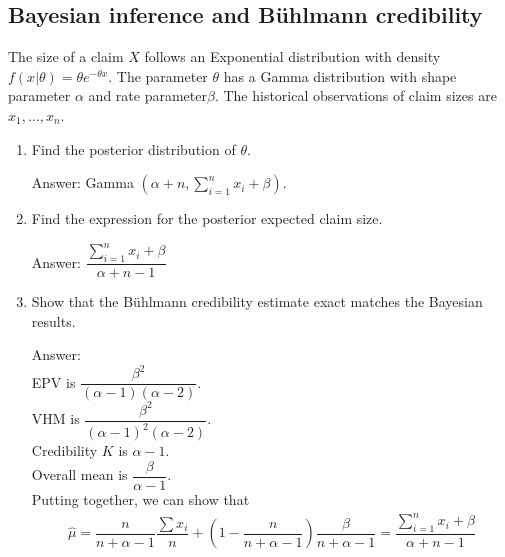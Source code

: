 \documentclass[11pt,a4paper,onecolumn]{article}
\begin{document}
\subsection{Bayesian inference and B\"{u}hlmann credibility}
The size of a claim $X$ follows an Exponential distribution with density $f(x|\theta) = \theta e^{-\theta x}$. The parameter $\theta$ has a Gamma distribution with shape parameter $\alpha$ and rate parameter$\beta$. The historical observations of claim sizes are $x_1,\dots, x_n$.
\begin{enumerate}
	\item Find the posterior distribution of $\theta$.\par
	Answer: Gamma $(\alpha+n,\sum_{i=1}^{n}x_i + \beta)$.
	\item Find the expression for the posterior expected claim size.\par
	Answer: $\dfrac{\sum_{i=1}^{n}x_i + \beta}{\alpha + n-1}$
	\item Show that the B\"{u}hlmann credibility estimate exact matches the Bayesian results.\par

		Answer: \\
	EPV is $\dfrac{\beta^2}{(\alpha-1)(\alpha-2)}$.\\
	VHM is $\dfrac{\beta^2}{(\alpha-1)^2(\alpha-2)}$.\\
	Credibility $K$ is $\alpha-1$.\\
	Overall mean is $\dfrac{\beta}{\alpha-1}$. \\
	Putting together, we can show that
	\begin{align*}
	\hat{\mu} = \dfrac{n}{n+\alpha-1}\dfrac{\sum x_i}{n} + \left(1-\dfrac{n}{n+\alpha-1}\right)\dfrac{\beta}{n+\alpha-1} = \dfrac{\sum_{i=1}^{n}x_i + \beta}{\alpha + n-1}
	\end{align*}
\end{enumerate}
\end{document}

